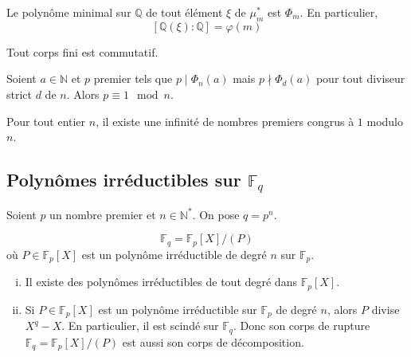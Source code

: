 	\begin{corollary}
		Le polynôme minimal sur $\mathbb{Q}$ de tout élément $\xi$ de $\mu_m^*$ est $\Phi_m$. En particulier,
		\[ [\mathbb{Q}(\xi):\mathbb{Q}]=\varphi(m) \]
	\end{corollary}
	
	\begin{application}
		Tout corps fini est commutatif.
	\end{application}
	
	
	\begin{lemma}
		Soient $a \in \mathbb{N}$ et $p$ premier tels que $p \mid \Phi_n(a)$ mais $p \nmid \Phi_d(a)$ pour tout diviseur strict $d$ de $n$. Alors $p \equiv 1 \mod n$.
	\end{lemma}
	
	
	\begin{application}
		Pour tout entier $n$, il existe une infinité de nombres premiers congrus à $1$ modulo $n$.
	\end{application}
	
	\subsection{Polynômes irréductibles sur \texorpdfstring{$\mathbb{F}_q$}{Fq}}
	
	Soient $p$ un nombre premier et $n \in \mathbb{N}^*$. On pose $q = p^n$.
	
	\begin{theorem}
		\[ \mathbb{F}_q = \mathbb{F}_p[X] / (P) \]
		où $P \in \mathbb{F}_p[X]$ est un polynôme irréductible de degré $n$ sur $\mathbb{F}_p$.
	\end{theorem}
	
	\begin{corollary}
		\begin{enumerate}[(i)]
			\item Il existe des polynômes irréductibles de tout degré dans $\mathbb{F}_p[X]$.
			\item Si $P \in \mathbb{F}_p[X]$ est un polynôme irréductible sur $\mathbb{F}_p$ de degré $n$, alors $P$ divise $X^q - X$. En particulier, il est scindé sur $\mathbb{F}_q$. Donc son corps de rupture $\mathbb{F}_q = \mathbb{F}_p[X] / (P)$ est aussi son corps de décomposition.
		\end{enumerate}
	\end{corollary}
	
